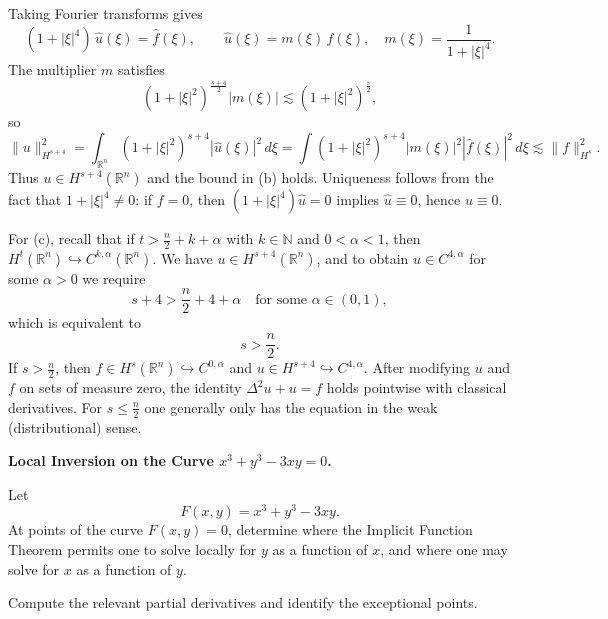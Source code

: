 \begin{solution}
Taking Fourier transforms gives
\[
(1+|\xi|^4)\,\widehat u(\xi) = \widehat f(\xi), \qquad
\widehat u(\xi) = m(\xi)\,\widehat f(\xi), \quad m(\xi)=\frac{1}{1+|\xi|^4}.
\]
The multiplier $m$ satisfies
\[
(1+|\xi|^2)^{\frac{s+4}{2}} |m(\xi)|
\lesssim (1+|\xi|^2)^{\frac{s}{2}},
\]
so
\[
\|u\|_{H^{s+4}}^2
= \int_{\mathbb R^n} (1+|\xi|^2)^{s+4} |\widehat u(\xi)|^2 \,d\xi
= \int (1+|\xi|^2)^{s+4} |m(\xi)|^2 |\widehat f(\xi)|^2\,d\xi
\lesssim \|f\|_{H^s}^2.
\]
Thus $u\in H^{s+4}(\mathbb R^n)$ and the bound in (b) holds.
Uniqueness follows from the fact that $1+|\xi|^4\neq 0$:
if $f=0$, then $(1+|\xi|^4)\widehat u=0$ implies $\widehat u\equiv 0$, hence $u\equiv 0$.

\medskip

For (c), recall that if $t> \frac n2 + k + \alpha$ with $k\in\mathbb N$ and $0<\alpha<1$,
then $H^t(\mathbb R^n)\hookrightarrow C^{k,\alpha}(\mathbb R^n)$.
We have $u\in H^{s+4}(\mathbb R^n)$, and to obtain $u\in C^{4,\alpha}$ for some $\alpha>0$
we require
\[
s+4 > \frac n2 + 4 + \alpha
\quad\text{for some } \alpha\in(0,1),
\]
which is equivalent to
\[
s > \frac n2.
\]
If $s>\frac n2$, then $f\in H^s(\mathbb R^n)\hookrightarrow C^{0,\alpha}$ and
$u\in H^{s+4}\hookrightarrow C^{4,\alpha}$.
After modifying $u$ and $f$ on sets of measure zero, the identity
$\Delta^2 u + u = f$ holds pointwise with classical derivatives.
For $s\le \frac n2$ one generally only has the equation in the weak (distributional) sense.
\end{solution}

\begin{problem}[CP-II-0417]
\label{prob:cp-ii-0417}
\textbf{Local Inversion on the Curve \(x^3+y^3-3xy=0\).}

\hspace*{1.5em}Let
\[
F(x,y)=x^3+y^3-3xy.
\]
At points of the curve \(F(x,y)=0\), determine where the Implicit Function
Theorem permits one to solve locally for \(y\) as a function of \(x\), and
where one may solve for \(x\) as a function of \(y\).

Compute the relevant partial derivatives and identify the exceptional points.
\end{problem}

